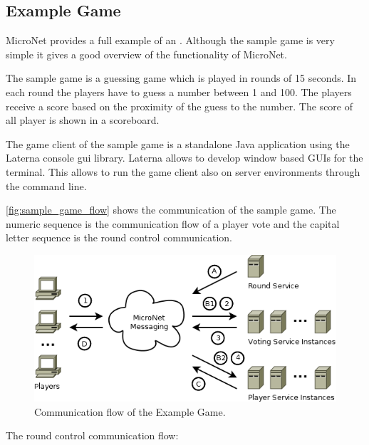 \subsection{Example Game}

MicroNet provides a full example of an \og{}. Although the sample game is very
simple it gives a good overview of the functionality of MicroNet.

The sample game is a guessing game which is played in rounds of 15 seconds.
In each round the players have to guess a number between 1 and 100. The players
receive a score based on the proximity of the guess to the number. The score of
all player is shown in a scoreboard. 

The game client of the sample game is a standalone Java application using the
Laterna console gui library. Laterna allows to develop window based GUIs for the
terminal. This allows to run the game client also on server environments
through the command line. 

\autoref{fig:sample_game_flow} shows the communication of the sample game. The
numeric sequence is the communication flow of a player vote and the capital
letter sequence is the round control communication.\\

\begin{figure}
	\centering
	\includegraphics[width=\textwidth]{images/architecture/SampleGame}
	\caption{Communication flow of the Example Game.}
	\label{fig:sample_game_flow}
\end{figure}

The round control communication flow:


